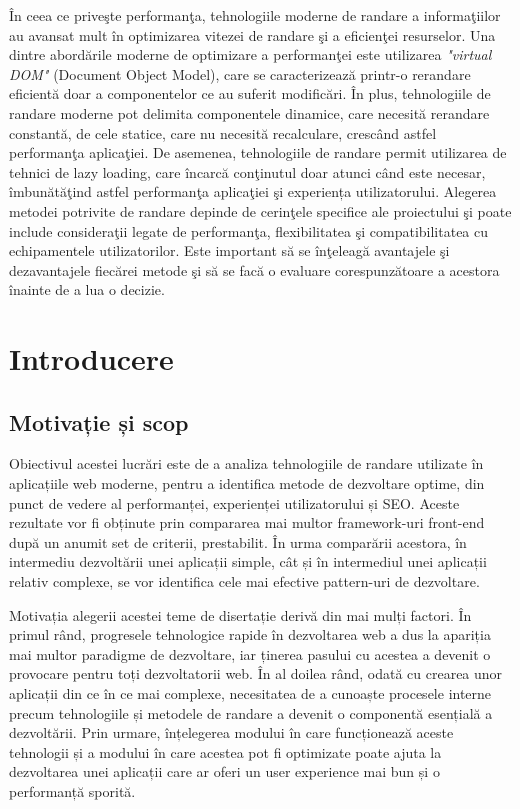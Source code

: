 \documentclass[12pt, a4paper]{report}
\begin{document}
\^ In ceea ce prive\c ste performan\c ta, tehnologiile moderne de randare a informa\c tiilor au avansat mult \^ in optimizarea vitezei de randare \c si a eficien\c tei resurselor. Una dintre abord\u arile moderne de optimizare a performan\c tei este utilizarea \emph{"virtual DOM"} (Document Object Model), care se caracterizează printr-o rerandare eficientă doar a componentelor ce au suferit modificări.
\^ In plus, tehnologiile de randare moderne pot delimita componentele dinamice, care necesită rerandare constantă, de cele statice, care nu necesit\u a recalculare, cresc\^ and astfel performan\c ta aplica\c tiei. De asemenea, tehnologiile de randare permit utilizarea de tehnici de lazy loading, care \^ incarc\u a con\c tinutul doar atunci c\^ and este necesar, \^ imbun\u at\u a\c tind astfel performan\c ta aplica\c tiei \c si experiența utilizatorului.
Alegerea metodei potrivite de randare depinde de cerin\c tele specifice ale proiectului \c si poate include considera\c tii legate de performan\c ta, flexibilitatea \c si compatibilitatea cu echipamentele utilizatorilor. Este important s\u a se \^ in\c teleag\u a avantajele \c si dezavantajele fiec\u arei metode \c si s\u a se fac\u a o evaluare corespunz\u atoare a acestora \^ inainte de a lua o decizie.

\chapter{Introducere}

\setcounter{page}{1}


\section{Motivație și scop}

Obiectivul acestei lucrări este de a analiza tehnologiile de randare utilizate în aplicațiile web moderne, pentru a identifica metode de dezvoltare optime, din punct de vedere al performanței, experienței utilizatorului și SEO. Aceste rezultate vor fi obținute prin compararea mai multor framework-uri front-end după un anumit set de criterii, prestabilit. În urma comparării acestora, în intermediu dezvoltării unei aplicații simple, cât și în intermediul unei aplicații relativ complexe, se vor identifica cele mai efective pattern-uri de dezvoltare.

Motivația alegerii acestei teme de disertație derivă din mai mulți factori. În primul rând, progresele tehnologice rapide în dezvoltarea web a dus la apariția mai multor paradigme de dezvoltare, iar ținerea pasului cu acestea a devenit o provocare pentru toți dezvoltatorii web. În al doilea rând, odată cu crearea unor aplicații din ce în ce mai complexe, necesitatea de a cunoaște procesele interne precum tehnologiile și metodele de randare a devenit o componentă esențială a dezvoltării. Prin urmare, înțelegerea modului în care funcționează aceste tehnologii și a modului în care acestea pot fi optimizate poate ajuta la dezvoltarea unei aplicații care ar oferi un user experience mai bun și o performanță sporită.
\end{document}
